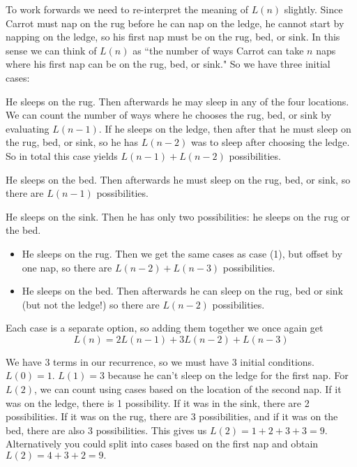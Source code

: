 \documentclass[12pt]{exam}
\begin{document}
\begin{solution}
\begin{qparts}
    To work forwards we need to re-interpret the meaning of $L(n)$ slightly. Since Carrot must nap on the rug before he can nap on the ledge, he cannot start by napping on the ledge, so his first nap must be on the rug, bed, or sink. In this sense we can think of $L(n)$ as ``the number of ways Carrot can take $n$ naps where his first nap can be on the rug, bed, or sink." So we have three initial cases:
    \begin{qsubparts}
         \item He sleeps on the rug. Then afterwards he may sleep in any of the four locations. We can count the number of ways where he chooses the rug, bed, or sink by evaluating $L(n-1).$ If he sleeps on the ledge, then after that he must sleep on the rug, bed, or sink, so he has $L(n-2)$ was to sleep after choosing the ledge. So in total this case yields $L(n-1)+L(n-2)$ possibilities.
        \item He sleeps on the bed. Then afterwards he must sleep on the rug, bed, or sink, so there are $L(n-1)$ possibilities.
        \item He sleeps on the sink. Then he has only two possibilities: he sleeps on the rug or the bed.
        \begin{itemize}
            \item He sleeps on the rug. Then we get the same cases as case (1), but offset by one nap, so there are $L(n-2)+L(n-3)$ possibilities.
            \item He sleeps on the bed. Then afterwards he can sleep on the rug, bed or sink (but not the ledge!) so there are $L(n-2)$ possibilities.
        \end{itemize}
    \end{qsubparts}
    Each case is a separate option, so adding them together we once again get
    $$L(n) = 2L(n-1) + 3L(n-2) + L(n-3)$$

    \item We have 3 terms in our recurrence, so we must have 3 initial conditions. $L(0) = 1$. $L(1) = 3$ because he can't sleep on the ledge for the first nap. For $L(2)$, we can count using cases based on the location of the second nap. If it was on the ledge, there is 1 possibility. If it was in the sink, there are 2 possibilities. If it was on the rug, there are 3 possibilities, and if it was on the bed, there are also 3 possibilities. This gives us $L(2) = 1 + 2 + 3 + 3 = 9.$ Alternatively you could split into cases based on the first nap and obtain $L(2)=4+3+2=9.$
\end{qparts}


\end{solution}
\end{document}
